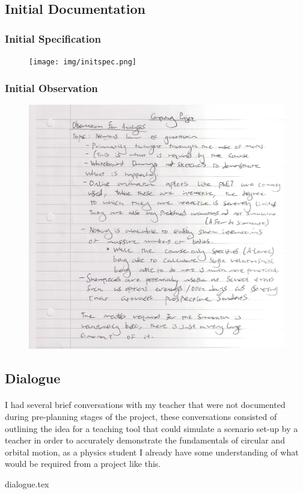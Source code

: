 \subsection{Initial Documentation}
\subsubsection{Initial Specification}
\begin{figure}[H]
  \centering
  \texttt{[image: img/initspec.png]}
\end{figure}

\subsubsection{Initial Observation}
\begin{figure}[H]
  \centering
  \includegraphics[width=\textwidth]{img/obs.png}
\end{figure}

\pagebreak

\subsection{Dialogue}
\paragraph{}
I had several brief conversations with my teacher that were not documented during pre-planning stages of the project, these conversations consisted of outlining the idea for a teaching tool that could simulate a scenario set-up by a teacher in order to accurately demonstrate the fundamentals of circular and orbital motion, as a physics student I already have some understanding of what would be required from a project like this.

\begin{small}
{dialogue.tex}
\end{small}

